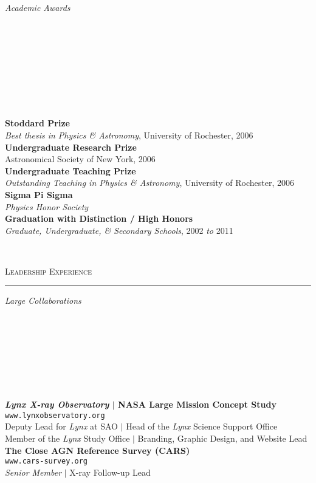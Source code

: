 \documentclass[11pt]{article}
\makeatletter
\def\vhrulefill#1{\leavevmode\leaders\hrule\@height#1\hfill \kern\z@}
\makeatother
\begin{document}
\hspace{2.5mm} \parbox{1.5in}{\textit{Academic Awards \\\\\\\\\\\\\\\\\\}} \parbox{5.15in}{
\textbf{Stoddard Prize} \\ \textit{Best thesis in Physics \& Astronomy}, University of Rochester, 2006 \\
\textbf{Undergraduate Research Prize} \\ Astronomical Society of New York, 2006 \\
\textbf{Undergraduate Teaching Prize} \\ \textit{Outstanding Teaching in Physics \& Astronomy}, University of Rochester, 2006\\
\textbf{Sigma Pi Sigma} \\ \textit{Physics Honor Society} \\
\textbf{Graduation with Distinction / High Honors} \\ \textit{Graduate, Undergraduate, \& Secondary Schools}, 2002 \textit{to} 2011
} \\


\vspace{2mm}




\textsc{Leadership Experience} \vhrulefill{0.4pt}


\vspace{6mm}

\hspace{2.5mm} \parbox{1.5in}{\textit{Large Collaborations \\\\\\\\\\\\\\\\}} \parbox{5.15in}{\textbf{\textit{Lynx X-ray Observatory} $|$ NASA Large Mission Concept Study} \\
\texttt{www.lynxobservatory.org} \\ Deputy Lead for \textit{Lynx} at SAO $|$ Head of the \textit{Lynx} Science Support Office \\ Member of the \textit{Lynx} Study Office $|$ Branding, Graphic Design, and Website Lead \\



\textbf{The Close AGN Reference Survey (CARS)} \\ \texttt{www.cars-survey.org} \\ \textit{Senior Member} $|$ X-ray Follow-up Lead \\
}
\end{document}
